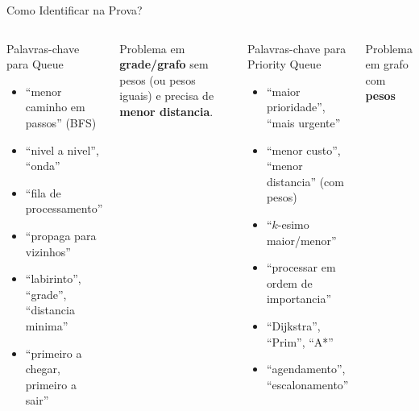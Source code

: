 \documentclass[aspectratio=169,11pt]{beamer}
\begin{document}
\begin{frame}{Como Identificar na Prova?}
  \begin{columns}[t]
      \begin{block}{Palavras-chave para Queue}
        \begin{itemize}\small
          \item ``menor caminho em passos'' (BFS)
          \item ``nivel a nivel'', ``onda''
          \item ``fila de processamento''
          \item ``propaga para vizinhos''
          \item ``labirinto'', ``grade'', ``distancia minima''
          \item ``primeiro a chegar, primeiro a sair''
        \end{itemize}
      \end{block}
      \vspace{0.15cm}
      \begin{tcolorbox}[caixaLaranja,title={Sinal: use Queue}]
        \small
        Problema em \textbf{grade/grafo} sem
        pesos (ou pesos iguais) e precisa
        de \textbf{menor distancia}.
      \end{tcolorbox}
      \begin{block}{Palavras-chave para Priority Queue}
        \begin{itemize}\small
          \item ``maior prioridade'', ``mais urgente''
          \item ``menor custo'', ``menor distancia'' (com pesos)
          \item ``$k$-esimo maior/menor''
          \item ``processar em ordem de importancia''
          \item ``Dijkstra'', ``Prim'', ``A*''
          \item ``agendamento'', ``escalonamento''
        \end{itemize}
      \end{block}
      \vspace{0.15cm}
      \begin{tcolorbox}[caixaRoxa,title={Sinal: use Priority Queue}]
        \small
        Problema em grafo com \textbf{pesos}

\end{tcolorbox}
\end{columns}
\end{frame}
\end{document}
